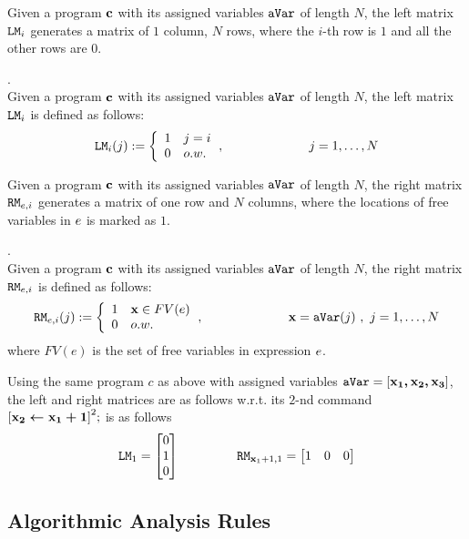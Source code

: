 \documentclass[a4paper,11pt]{article}
\begin{document}
Given a program  $\boldsymbol{\mathbf{c}}$ with its assigned variables $\mathtt{aVar}$ of length $N$,
the left matrix $\mathtt{LM}_i$ generates a matrix of $1$ column, $N$ rows, 
where the $i$-th row is $1$ and all the other rows are $0$.
%
\begin{defn}.
\\
Given a program  $\boldsymbol{\mathbf{c}}$ with its assigned variables $\mathtt{aVar}$ of length $N$, 
the left matrix $\mathtt{LM}_i$ is defined as follows:
\[
	\lMtrix_i(j) : = 
	\left
	\{
	\begin{array}{ll}
	1 & j = i \\
	0 & o.w.
	\end{array}
	\right.,
	~~~~~~~~~~~~~~~~~~~~ 
	j = 1, \ldots, N
\]
\end{defn}
%
Given a program  $\boldsymbol{\mathbf{c}}$ with its assigned variables $\mathtt{aVar}$ of length $N$,
the right matrix $\mathtt{RM}_{e, i}$ generates a matrix of one row and $N$ columns, 
where the locations of free variables in $e$ is marked as $1$. 
%
%
\begin{defn}.
\\
Given a program  $\boldsymbol{\mathbf{c}}$ with its assigned variables $\mathtt{aVar}$ of length $N$, 
the right matrix $\mathtt{RM}_{e, i}$ is defined as follows:
\[
	\rMtrix_{\expr, i}(j) : = 
	\left\{
	\begin{array}{ll}
	1 & \ssa{x} \in FV(\expr) 
	\\
	0 & o.w.
	\end{array}
	\right.,
	~~~~~~~~~~~~~~~~~~~~ 
	\ssa{x} = \avar(j) ~ , ~ j = 1, \ldots, N
\]
where $FV(e)$ is the set of free variables in expression $e$.
%
%
\end{defn}
%
Using the same program $c$ as above with assigned variables $\mathtt{aVar} = [ \boldsymbol{\mathbf{x_1 , x_2 , x_3}} ] $,
the left and right matrices are as follows w.r.t. its $2$-nd command 
$\left[\ssa{\assign {x_2} {x_1 + 1}}	\right]^2;$ 
is as follows
\[
\lMtrix_1 = \left[ \begin{matrix}
 0   \\
 1 	 \\
 0   \\
\end{matrix}   \right ] 
~~~~~~~~~~~~~~
\rMtrix_{\ssa{x}_1 + 1, 1}
= \left[ \begin{matrix} 
   1 & 0 & 0 \\
\end{matrix}  \right]
\]
%
%
%
\subsection{Algorithmic Analysis Rules}
%
\end{document}
